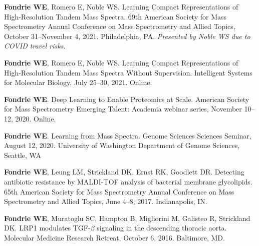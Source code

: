 \documentclass[11pt]{article}
\newcommand{\mysection}[1]{\vspace{1ex \textbf{\large \textrm{#1}} \quad
    \hrulefill}}
\begin{document}
\mysection{Talks}
\begin{etaremune}
  \item \textbf{Fondrie WE}, Romero E, Noble WS. Learning Compact
  Representations of High-Resolution Tandem Mass Spectra. 69th American Society
  for Mass Spectrometry Annual Conference on Mass Spectrometry and Allied
  Topics, October 31--November 4, 2021. Philadelphia, PA. \textit{Presented by
    Noble WS due to COVID travel risks.}

  \item \textbf{Fondrie WE}, Romero E, Noble WS. Learning Compact
  Representations of High-Resolution Tandem Mass Spectra Without Supervision.
  Intelligent Systems for Molecular Biology, July 25--30, 2021. Online.

  \item \textbf{Fondrie WE}. Deep Learning to Enable Proteomics at Scale.
  American Society for Mass Spectrometry Emerging Talent: Academia webinar
  series, November 10--12, 2020. Online.
  
  \item \textbf{Fondrie WE}. Learning from Mass Spectra. Genome Sciences
  Sciences Seminar, August 12, 2020. University of Washington Department of
  Genome Sciences, Seattle, WA
  
  \item \textbf{Fondrie WE}, Leung LM, Strickland DK, Ernst RK, Goodlett DR.
  Detecting antibiotic resistance by MALDI-TOF analysis of bacterial membrane
  glycolipids. 65th American Society for Mass Spectrometry Annual Conference on
  Mass Spectrometry and Allied Topics, June 4--8, 2017. Indianapolis, IN.
    
  \item \textbf{Fondrie WE}, Muratoglu SC, Hampton B, Migliorini M, Galisteo R,
  Strickland DK. LRP1 modulates TGF-$\beta$ signaling in the descending
  thoracic aorta. Molecular Medicine Research Retreat, October 6, 2016.
  Baltimore, MD.
\end{etaremune}
\end{document}
